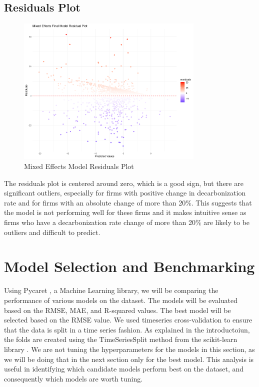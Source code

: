 \subsection{Residuals Plot}
\begin{figure}[H]
    \centering
    \includegraphics[width=0.8\textwidth]{figures/final_model_residuals.png}
    \caption{Mixed Effects Model Residuals Plot}
    \label{fig:mixed_effects_residuals}
\end{figure}
\noindent The residuals plot is centered around zero, which is a good sign, but there are significant outliers, especially for firms with positive change in decarbonization rate and for firms with an absolute change of more than 20\%. This suggests that the model is not performing well for these firms and it makes intuitive sense as firms who have a decarbonization rate change of more than 20\% are likely to be outliers and difficult to predict.

\section{Model Selection and Benchmarking}
Using Pycaret \cite{pycaret}, a Machine Learning library, we will be comparing the performance of various models on the dataset. The models will be evaluated based on the RMSE, MAE, and R-squared values. The best model will be selected based on the RMSE value. We used timeseries cross-validation to ensure that the data is split in a time series fashion. As explained in the introductoiun, the folds are created using the TimeSeriesSplit method from the scikit-learn library \cite{scikit-learn}. We are not tuning the hyperparameters for the models in this section, as we will be doing that in the next section only for the best model. This analysis is useful in identifying which candidate models perform best on the dataset, and consequently which models are worth tuning.

